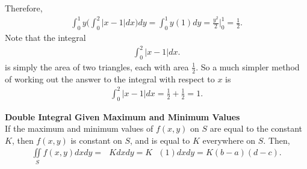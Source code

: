 Therefore,
\begin{align*}
  \int_{0}^{1} y \Bigg( \int_0^{2}   \big| x-1\big| dx\Bigg)dy =   \int_{0}^{1} y (1) dy =   \frac{y^2}{2}\Big|_{0}^{1}= \frac{1}{2} .
\end{align*}
Note that the integral 
\begin{align*}
  \int_0^{2}   \big| x-1\big| dx.
\end{align*}
is simply the area of two triangles, each with area $\frac{1}{2}$. So a much simpler method of working out the answer to the integral with respect to $x$ is 
\begin{align*}
  \int_0^{2}   \big| x-1\big| dx = \frac{1}{2} + \frac{1}{2} = 1.
\end{align*}
\item %
\textbf{Double Integral Given Maximum and Minimum Values}\\
If the maximum and minimum values of $f(x,y)$ on $S$ are equal to the constant $K$, then $f(x,y)$ is constant on $S$, and is equal to $K$ everywhere on $S$. 
Then,
\begin{align*}
  \iint\limits_S f(x,y) dxdy = \mathop{\int_{a}^{b} \! \int_c^{d}  } K dxdy  = K \mathop{\int_{a}^{b} \! \int_c^{d}  } (1) dxdy = K(b-a)(d-c).
\end{align*}

